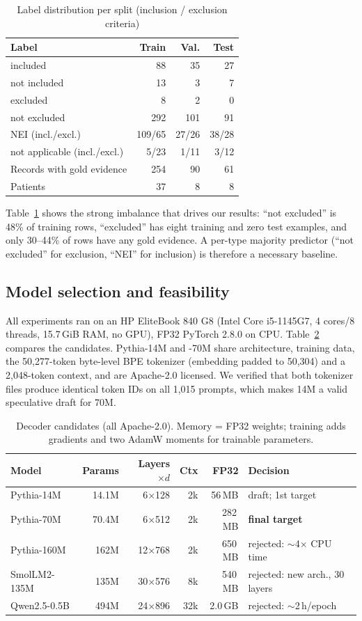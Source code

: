 \begin{table}[t]\centering\caption{Label distribution per split (inclusion / exclusion criteria)}\label{tab:data}\footnotesize
\begin{tabular}{lrrr}\hline
Label & Train & Val. & Test\\\hline
included & 88 & 35 & 27\\
not included & 13 & 3 & 7\\
excluded & 8 & 2 & 0\\
not excluded & 292 & 101 & 91\\
NEI (incl./excl.) & 109/65 & 27/26 & 38/28\\
not applicable (incl./excl.) & 5/23 & 1/11 & 3/12\\\hline
Records with gold evidence & 254 & 90 & 61\\
Patients & 37 & 8 & 8\\\hline
\end{tabular}\end{table}
Table~\ref{tab:data} shows the strong imbalance that drives our results: ``not excluded'' is 48\% of training rows, ``excluded'' has eight training and zero test examples, and only 30--44\% of rows have any gold evidence. A per-type majority predictor (``not excluded'' for exclusion, ``NEI'' for inclusion) is therefore a necessary baseline.

\subsection{Model selection and feasibility}\label{sec:model}
All experiments ran on an HP EliteBook 840 G8 (Intel Core i5-1145G7, 4 cores/8 threads, 15.7\,GiB RAM, no GPU), FP32 PyTorch 2.8.0 on CPU. Table~\ref{tab:cand} compares the candidates. Pythia-14M and -70M share architecture, training data, the 50,277-token byte-level BPE tokenizer (embedding padded to 50,304) and a 2,048-token context, and are Apache-2.0 licensed. We verified that both tokenizer files produce identical token IDs on all 1,015 prompts, which makes 14M a valid speculative draft for 70M.

\begin{table}[t]\centering\caption{Decoder candidates (all Apache-2.0). Memory = FP32 weights; training adds gradients and two AdamW moments for trainable parameters.}\label{tab:cand}\footnotesize
\begin{tabular}{lrrrrl}\hline
Model & Params & Layers$\times d$ & Ctx & FP32 & Decision\\\hline
Pythia-14M & 14.1M & 6$\times$128 & 2k & 56\,MB & draft; 1st target\\
Pythia-70M & 70.4M & 6$\times$512 & 2k & 282\,MB & \textbf{final target}\\
Pythia-160M & 162M & 12$\times$768 & 2k & 650\,MB & rejected: $\sim$4$\times$ CPU time\\
SmolLM2-135M & 135M & 30$\times$576 & 8k & 540\,MB & rejected: new arch., 30 layers\\
Qwen2.5-0.5B & 494M & 24$\times$896 & 32k & 2.0\,GB & rejected: $\sim$2\,h/epoch\\\hline
\end{tabular}\end{table}


